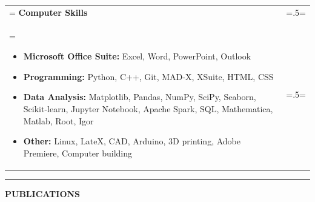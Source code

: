 \documentclass[letterpaper, 11pt]{article}
\begin{document}
\begin{tabularx}{1.0\textwidth} { 
   >{\raggedright\arraybackslash\hsize=1.5\hsize\linewidth=\hsize}X 
   >{\raggedleft\arraybackslash\hsize=.5\hsize\linewidth=\hsize}X }
\normalsize
\bf{Computer Skills} & \\
\normalfont \begin{itemize}[leftmargin=*,noitemsep,topsep=0pt]
\item \textbf{Microsoft Office Suite:}  Excel, Word, PowerPoint, Outlook
\item \textbf{Programming:} Python, C++, Git, MAD-X, XSuite, HTML, CSS
\item \textbf{Data Analysis:} Matplotlib, Pandas, NumPy, SciPy, Seaborn, Scikit-learn, Jupyter Notebook, Apache Spark, SQL, Mathematica, Matlab, Root, Igor
\item \textbf{Other:} Linux, LateX, CAD, Arduino, 3D printing, Adobe Premiere, Computer building
\end{itemize} & 
\end{tabularx}

\newpage
\begin{center}
\noindent\rule{0.75\textwidth}{1pt}
\end{center}

\begin{center}
\large\bf{PUBLICATIONS}
\end{center}

\nocite{*}

\printbibliography[keyword=primaryauthor, title=\normalsize Primary Author, heading=subbibliography]
\printbibliography[keyword=secondaryauthor, title=\normalsize Co-Author, heading=subbibliography]


\end{document}
